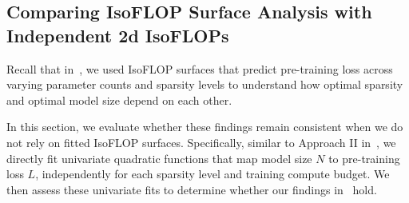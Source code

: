 \subsection{Comparing IsoFLOP Surface Analysis with Independent 2d IsoFLOPs}
\label{app:validating_isoflop}

Recall that in~,  we used IsoFLOP surfaces that predict pre-training loss across varying parameter counts and sparsity levels to understand how optimal sparsity and optimal model size depend on each other. 

In this section, we evaluate whether these findings remain consistent when we do not rely on fitted IsoFLOP surfaces.
Specifically, similar to Approach II in~\citet{hoffmann2022training}, we directly fit univariate quadratic functions that map model size $N$ to pre-training loss $L$, independently for each sparsity level and training compute budget. We then assess these univariate fits to determine whether our findings in~ hold.


